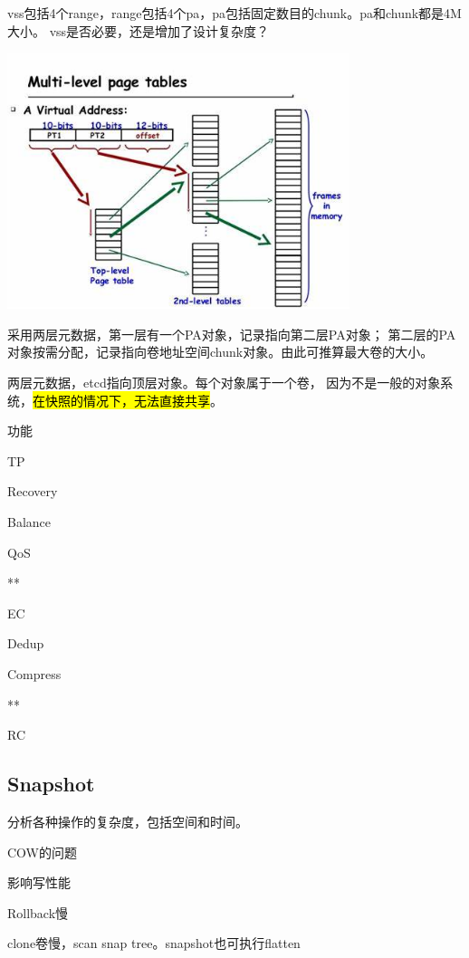 vss包括4个range，range包括4个pa，pa包括固定数目的chunk。pa和chunk都是4M大小。
vss是否必要，还是增加了设计复杂度？

\begin{center}
\includegraphics[width=10cm]{../imgs/oos/pagetable.jpeg}
\end{center}

采用两层元数据，第一层有一个PA对象，记录指向第二层PA对象；
第二层的PA对象按需分配，记录指向卷地址空间chunk对象。由此可推算最大卷的大小。

两层元数据，etcd指向顶层对象。每个对象属于一个卷，
因为不是一般的对象系统，\hl{在快照的情况下，无法直接共享}。

\hrulefill

功能
\begin{enumbox}
\item TP
\item Recovery
\item Balance
\item QoS
\item ***
\item EC
\item Dedup
\item Compress
\item ***
\item RC
\end{enumbox}

\subsection{Snapshot}

分析各种操作的复杂度，包括空间和时间。

\hrulefill

COW的问题
\begin{enumbox}
\item 影响写性能
\item Rollback慢
\item clone卷慢，scan snap tree。snapshot也可执行flatten
\end{enumbox}

